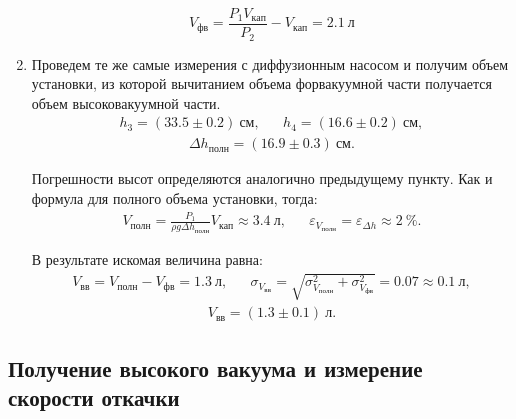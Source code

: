\documentclass[a4paper,12pt]{article}
\theoremstyle{definition}
\begin{document}
\begin{enumerate}
		\begin{equation}
			V_{фв} = \frac{P_1 V_{кап}}{P_2} - V_{кап} = 2.1 \ л
		\end{equation}
		
		
		\item Проведем те же самые измерения с диффузионным насосом и получим объем установки, из которой вычитанием объема форвакуумной части получается объем высоковакуумной части. 
		\begin{align}
			h_3 = (33.5 \pm 0.2) ~см, && h_4 = (16.6 \pm 0.2) ~см,
		\end{align}
		\begin{align}
			\Delta h_{полн} = (16.9 \pm 0.3) ~см.
		\end{align}
	
		
		Погрешности высот определяются аналогично предыдущему пункту. Как и формула для полного объема установки, тогда:
		\begin{align}
			V_\text{полн} = \frac{P_1}{\rho g \Delta h_\text{полн}} V_{кап} \approx 3.4~л,&&
			\varepsilon_{V_{полн}} = \varepsilon_{\Delta h} \approx 2~\%.
		\end{align}
		
		В результате искомая величина равна:
		\begin{align}
			V_{вв} = V_{полн} - V_{фв} = 1.3~л, && \sigma_{V_{вв}} = \sqrt{\sigma_{V_{полн}}^2+ \sigma_{V_{фв}}^2} = 0.07 \approx 0.1 ~л,
		\end{align}
		\begin{align}
			V_{вв} = (1.3 \pm 0.1)~л.
		\end{align}
		
	\end{enumerate}
	
	\subsection{Получение высокого вакуума и измерение скорости откачки}
	
\end{document}
